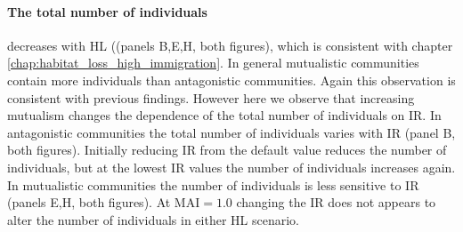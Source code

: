 \paragraph*{The total number of individuals} decreases with HL ((panels B,E,H, both figures), which is consistent with chapter \ref{chap:habitat_loss_high_immigration}. In general mutualistic communities contain more individuals than antagonistic communities. Again this observation is consistent with previous findings. However here we observe that increasing mutualism changes the dependence of the total number of individuals on IR. In antagonistic communities the total number of individuals varies with IR (panel B, both figures). Initially reducing IR from the default value reduces the number of individuals, but at the lowest IR values the number of individuals increases again. In mutualistic communities the number of individuals is less sensitive to IR (panels E,H, both figures). At MAI$ =1.0$ changing the IR does not appears to alter the number of individuals in either HL scenario.

